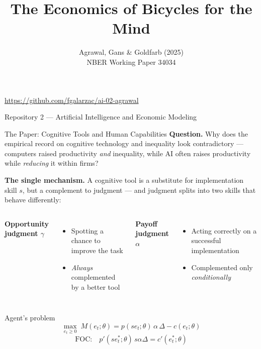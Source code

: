 \documentclass[aspectratio=169,11pt]{beamer}
\title{The Economics of Bicycles for the Mind}
\subtitle{Agrawal, Gans \& Goldfarb (2025)\\[0.4em]
NBER Working Paper 34034}
\author{}
\date{}
\begin{document}
\begin{frame}[plain]
  \titlepage
  \vspace{-1.1em}
  \begin{center}
    \small\url{https://github.com/fgalarzac/ai-02-agrawal}

    \vfill
    \footnotesize Repository 2 --- Artificial Intelligence and Economic Modeling
  \end{center}
\end{frame}

\begin{frame}{The Paper: Cognitive Tools and Human Capabilities}
  \textbf{Question.} Why does the empirical record on cognitive technology and
  inequality look contradictory --- computers raised productivity \emph{and}
  inequality, while AI often raises productivity while \emph{reducing} it
  within firms?

  \smallskip
  \textbf{The single mechanism.} A cognitive tool is a substitute for
  implementation skill $s$, but a complement to judgment --- and judgment
  splits into two skills that behave differently:
  \begin{columns}[T,onlytextwidth]
      \textbf{Opportunity judgment $\gamma$}
      \begin{itemize}
        \item Spotting a chance to improve the task
        \item \emph{Always} complemented by a better tool
      \end{itemize}
      \textbf{Payoff judgment $\alpha$}
      \begin{itemize}
        \item Acting correctly on a successful implementation
        \item Complemented only \emph{conditionally}
      \end{itemize}
  \end{columns}

  \vspace{-0.1em}
  \begin{block}{Agent's problem}
    \vspace{-0.7em}
    \[
      \max_{e_t\geq0}\; M(e_t;\theta)=p(se_t;\theta)\,\alpha\,\Delta-c(e_t;\theta)
    \]
    \vspace{-1.0em}
    \[
      \text{FOC:}\quad p'(se_t^*;\theta)\,s\alpha\Delta=c'(e_t^*;\theta)
    \]
  \end{block}
\end{frame}
\end{document}
